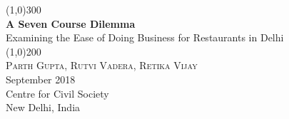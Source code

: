 \documentclass[a4paper, 12pt]{article}
\begin{document}
                    
                    \begin{titlepage}
                    	\begin{center}
                    	\line(1,0){300}\\
                    	[0.25in]
                    	\huge{\bfseries \textcolor{CCSbrown} {A Seven Course Dilemma}} \\
    	[0.5cm]
    	\large  {Examining the Ease of Doing Business for Restaurants in Delhi} \\%
    	
                    	\line(1,0){200}\\
                    	[1in]
                    	\textsc{\huge Parth Gupta, Rutvi Vadera, Retika Vijay} \\ %
                    	[1.5cm]
                    	{\Large September 2018} \\
                    	[2.0cm]
                    	{\LARGE Centre for Civil Society} \\
                    	[0.1mm]
                    	{\Large New Delhi, India} \\
    	[2.0cm]
      
                    \end{center}
                    \end{titlepage}
                    
                    \tableofcontents
                    
                   \newpage
                   
\end{document}

